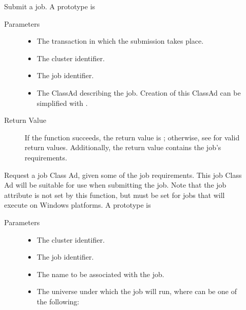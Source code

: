 \begin{description}
\item []
  Submit a job.
  A prototype is

  
  \begin{description}
    \item[ Parameters]
    \begin{itemize}
      \item {}
      The transaction in which the submission takes place.
      \item {} The cluster identifier.
      \item {} The job identifier.
      \item {}
      The ClassAd describing the job. Creation of this ClassAd can be simplified
      with .
    \end{itemize}
    \item[ Return Value]
      If the function succeeds, the return value is ; 
      otherwise, see  for valid return values. Additionally,
      the return value contains the job's requirements.
  \end{description}  

\item []
  Request a job Class Ad, given some of the job requirements.
  This job Class Ad will be suitable for use when submitting the job.
  Note that the job attribute  is not set by this
  function, but must be set for jobs that will execute on Windows
  platforms.
  A prototype is 


  \begin{description}
    \item[ Parameters]
    \begin{itemize}
      \item {} The cluster identifier.
      \item {} The job identifier.
      \item {} 
      The name to be associated with the job.
      \item {}
      The universe under which the job will run, where  can be
      one of the following:


\end{itemize}
\end{description}
\end{description}
